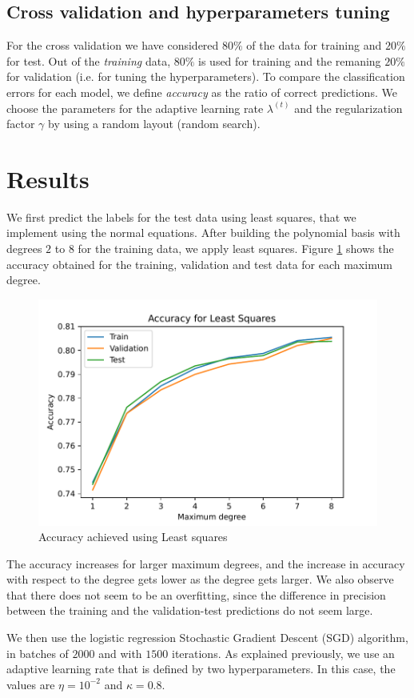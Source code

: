 \documentclass[10pt,conference,compsocconf]{IEEEtran}
\begin{document}
	\subsection{Cross validation and hyperparameters tuning} %
	\label{sub:cross_validation_and_hyperparameters_tuning}
  	For the cross validation we have considered $80\%$ of the data for training and $20\%$ for test. Out of the \emph{training} data, $80\%$ is used for training and the remaning $20\%$ for validation (i.e. for tuning the hyperparameters). To compare the classification errors for each model, we define \emph{accuracy} as the ratio of correct predictions.	We choose the parameters for the adaptive learning rate $\lambda^{(t)}$ and the regularization factor $\gamma$ by using a random layout (random search).

\section{Results}
\label{sec:results}
    We first predict the labels for the test data using least squares, that we implement using the normal equations. After building the polynomial basis with degrees $2$ to $8$ for the training data, we apply least squares. Figure \ref{fig:1LSprec} shows the accuracy obtained for the training, validation and test data for each maximum degree.

    \begin{figure}[htp]
      \centering
      \includegraphics[width=.45\textwidth]{1LSprec}
      \caption{Accuracy achieved using Least squares}
      \label{fig:1LSprec}
    \end{figure}

    The accuracy increases for larger maximum degrees, and the increase in accuracy with respect to the degree gets lower as the degree gets larger. We also observe that there does not seem to be an overfitting, since the difference in precision between the training and the validation-test predictions do not seem large.

    We then use the logistic regression Stochastic Gradient Descent (SGD) algorithm, in batches of $2000$ and with $1500$ iterations. As explained previously, we use an adaptive learning rate that is defined by two hyperparameters. In this case, the values are $\eta = 10^{-2}$ and $\kappa = 0.8$.
\end{document}
